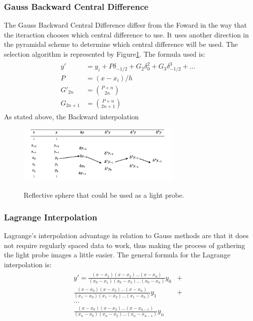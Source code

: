 \documentclass[conference]{acmsiggraph}
\begin{document}
\subsubsection{Gauss Backward Central Difference}
	The Gauss Backward Central Difference diffesr from the Foward in the way that the iteraction chooses which central difference to use. 
It uses another direction in the pyramidal scheme to determine which central difference will be used. The selection algorithm is represented 
by Figure\ref{fig:backwardcentral}. The formula used is:
\begin{align}
\begin{split}
	y' &= y_i + P \delta_{-1/2} + G_2 \delta_0^2 + G_3 \delta_{-1/2}^3 + \dots\\
	P &= (x-x_i)/h \\
	G'_{2n} &= \binom{P+n}{2n} \\
	G_{2n+1} &= \binom{P+n}{2n+1}
\end{split}
\end{align}
	As stated above, the Backward interpolation 

\begin{figure}[H]
	\caption{Reflective sphere that could be used as a light probe.}
	\centering
	\includegraphics[width=08cm]{images/backward.png}
	\label{fig:backwardcentral}
\end{figure}

\subsubsection{Lagrange Interpolation}
	Lagrange’s interpolation \cite{pozrikidis1998} advantage in relation to Gauss methods are that it does not require regularly spaced data to work, thus making the process of gathering the light probe images a little easier. The general formula for the Lagrange interpolation is:
\begin{align}
\begin{split}
	y' = \frac{(x-x_1)(x-x_2)\dots(x-x_n)}{(x_0-x_1)(x_0-x_2)\dots(x_0-x_n)}y_0 &+ \\
		 \frac{(x-x_0)(x-x_2)\dots(x-x_n)}{(x_1-x_0)(x_1-x_2)\dots(x_1-x_n)}y_1 &+ \\
		 \dots &\\
		 \frac{(x-x_0)(x-x_2)\dots(x-x_{n-1})}{(x_n-x_0)(x_n-x_2)\dots(x_n-x_{n-1})}y_n &
\end{split}
\end{align}
\end{document}
